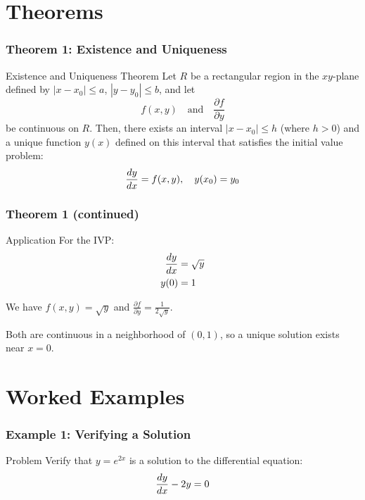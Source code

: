 \section{Theorems}

\begin{frame}
    \frametitle{Theorem 1: Existence and Uniqueness}
    
    \begin{theorembox}{Existence and Uniqueness Theorem}
        Let $R$ be a rectangular region in the $xy$-plane defined by $|x - x_0| \leq a$, $|y - y_0| \leq b$, and let
        \[
        f(x, y) \quad \text{and} \quad \frac{\partial f}{\partial y}
        \]
        be continuous on $R$. Then, there exists an interval $|x - x_0| \leq h$ (where $h > 0$) and a unique function $y(x)$ defined on this interval that satisfies the initial value problem:
        \[
        \frac{dy}{dx} = f(x, y), \quad y(x_0) = y_0
        \]
    \end{theorembox}
\end{frame}

\begin{frame}
    \frametitle{Theorem 1 (continued)}
    
    \begin{examplebox}{Application}
        For the IVP:
        \begin{align*}
            \frac{dy}{dx} &= \sqrt{y} \\
            y(0) &= 1
        \end{align*}
        
        We have $f(x,y) = \sqrt{y}$ and $\frac{\partial f}{\partial y} = \frac{1}{2\sqrt{y}}$.
        
        Both are continuous in a neighborhood of $(0, 1)$, so a unique solution exists near $x = 0$.
    \end{examplebox}
\end{frame}

\section{Worked Examples}

\begin{frame}
    \frametitle{Example 1: Verifying a Solution}
    
    \begin{problembox}{Problem}
        Verify that $y = e^{2x}$ is a solution to the differential equation:
        \[
        \frac{dy}{dx} - 2y = 0
        \]
    \end{problembox}
\end{frame}

